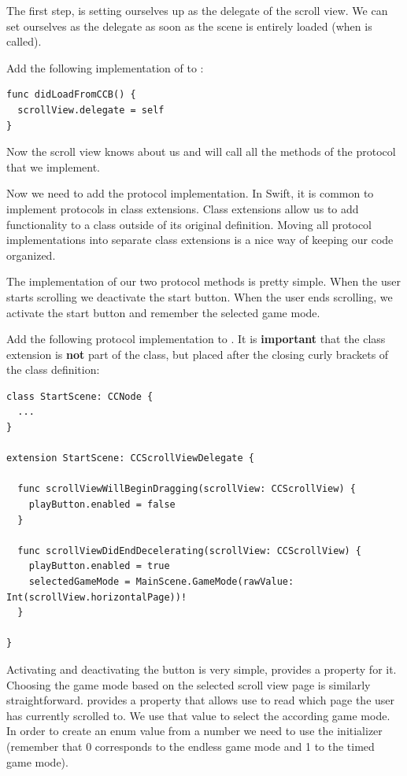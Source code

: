 The first step, is setting ourselves up as the delegate of the scroll view. We
can set ourselves as the delegate as soon as the scene is entirely loaded (when
 is called). 
\begin{leftbar}
Add the following implementation of  to
:
\begin{lstlisting}
func didLoadFromCCB() {
  scrollView.delegate = self
}
\end{lstlisting}
\end{leftbar}
Now the scroll view knows about us and will call all the methods of the
 protocol that we implement.

Now we need to add the protocol implementation. In Swift, it is common to
implement protocols in class extensions. Class extensions allow us to add functionality to
a class outside of its original definition. Moving all protocol
implementations into separate class extensions is a nice way of keeping our code
organized. 

The implementation of our two protocol methods is pretty simple. When the user
starts scrolling we deactivate the start button. When the user ends scrolling,
we activate the start button and remember the selected game mode.
\begin{leftbar}
Add the following protocol implementation to . It
is \textbf{important} that the class extension is \textbf{not} part of the
class, but placed after the closing curly brackets of the class definition:
\begin{lstlisting}
class StartScene: CCNode {
  ...  
}

extension StartScene: CCScrollViewDelegate {
  
  func scrollViewWillBeginDragging(scrollView: CCScrollView) {
    playButton.enabled = false
  }
  
  func scrollViewDidEndDecelerating(scrollView: CCScrollView) {
    playButton.enabled = true
    selectedGameMode = MainScene.GameMode(rawValue: Int(scrollView.horizontalPage))!
  }
  
}
\end{lstlisting}
\end{leftbar}
Activating and deactivating the button is very simple, 
provides a property for it. Choosing the game mode based on the selected scroll
view page is similarly straightforward.  provides a
 property that allows use to read which page the user
has currently scrolled to. We use that value to select the according game mode.
In order to create an enum value from a number we need to use the
 initializer (remember that 0 corresponds to the endless
game mode and 1 to the timed game mode).


